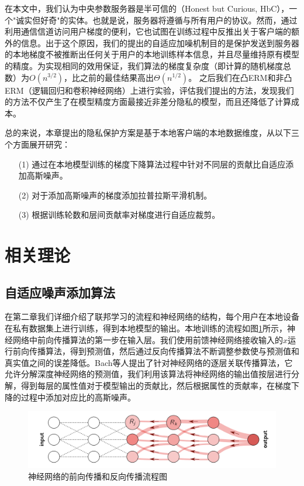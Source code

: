 在本文中，我们认为中央参数服务器是半可信的（Honest but Curious, HbC），一个"诚实但好奇"的实体。也就是说，服务器将遵循与所有用户的协议。然而，通过利用通信信道访问用户梯度的便利，它也试图在训练过程中反推出关于客户端的额外的信息。出于这个原因，我们的提出的自适应加噪机制目的是保护发送到服务器的本地梯度不被推断出任何关于用户的本地训练样本信息，并且尽量维持原有模型的精度。为实现相同的效用保证，我们算法的梯度复杂度（即计算的随机梯度总数）为$O\left(n^{3 / 2}\right)$，比之前的最佳结果高出$\Theta\left(n^{1 / 2}\right)$。 之后我们在凸ERM和非凸ERM（逻辑回归和卷积神经网络）上进行实验，评估我们提出的方法，发现我们的方法不仅产生了在模型精度方面最接近非差分隐私的模型，而且还降低了计算成本。

总的来说，本章提出的隐私保护方案是基于本地客户端的本地数据维度，从以下三个方面展开研究：
\begin{enumerate}
\item [(1)] 通过在本地模型训练的梯度下降算法过程中针对不同层的贡献比自适应添加高斯噪声。
\item [(2)] 对于添加高斯噪声的梯度添加拉普拉斯平滑机制。
\item [(3)] 根据训练轮数和层间贡献率对梯度进行自适应裁剪。
\end{enumerate}

\section{相关理论}

\subsection{自适应噪声添加算法}
在第二章我们详细介绍了联邦学习的流程和神经网络的结构，每个用户在本地设备在私有数据集上进行训练，得到本地模型的输出。本地训练的流程如图\ref{fig:神经网络的前向传播和反向传播流程图}所示，神经网络中前向传播算法的第一步在输入层。我们使用前馈神经网络接收输入的$x$运行前向传播算法，得到预测值，然后通过反向传播算法不断调整参数使与预测值和真实值之间的误差降低。Bach等人提出了针对神经网络的逐层关联传播算法，它允许分解深度神经网络的预测值，我们利用该算法将神经网络的输出值按层进行分解，得到每层的属性值对于模型输出的贡献比，然后根据属性的贡献率，在梯度下降的过程中添加对应比的高斯噪声。

\begin{figure}[!hbt]
\centering
	\includegraphics[scale=0.45]{fig2/C3/逐层关联传播算法}%
	\caption{神经网络的前向传播和反向传播流程图}
	\label{fig:神经网络的前向传播和反向传播流程图}	
\end{figure}

